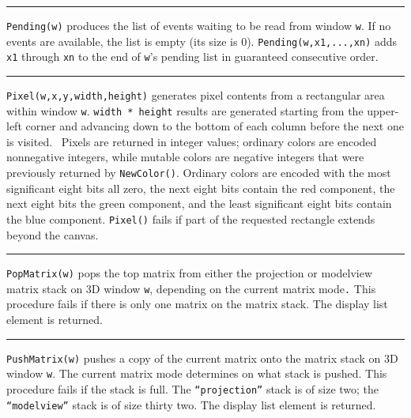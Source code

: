 \bigskip\hrule\vspace{0.1cm}

\noindent
\texttt{Pending(w)} produces the list of events waiting to be read from
window \texttt{w}. If no events are available, the list is empty (its
size is 0). \texttt{Pending(w,x1,...,xn)} adds \texttt{x1} through
\texttt{xn} to the end of \texttt{w}'s pending list in
guaranteed consecutive order.

\bigskip\hrule\vspace{0.1cm}

\noindent
\texttt{Pixel(w,x,y,width,height)} generates pixel contents from a
rectangular area within window \texttt{w}. \texttt{width * height}
results are generated starting from the upper-left corner and advancing
down to the bottom of each column before the next one is visited.
\ Pixels are returned in integer values; ordinary colors are encoded
nonnegative integers, while mutable colors are negative integers that
were previously returned by \texttt{NewColor()}. Ordinary colors are
encoded with the most significant eight bits all zero, the next eight
bits contain the red component, the next eight bits the green
component, and the least significant eight bits contain the blue
component. \texttt{Pixel()} fails if part of the requested rectangle
extends beyond the canvas.

\bigskip\hrule\vspace{0.1cm}

\noindent
\texttt{PopMatrix(w)} pops the top matrix from either the projection or
modelview matrix stack on 3D window \texttt{w}, depending on the
current matrix mode\texttt{.} This procedure fails if there is only one
matrix on the matrix stack. The display list element is returned. 

\bigskip\hrule\vspace{0.1cm}

\noindent
\texttt{PushMatrix(w)} pushes a copy of the current matrix onto the
matrix stack on 3D window \texttt{w}. The current matrix mode
determines on what stack is pushed. This procedure fails if the stack
is full. The \texttt{{\textquotedblleft}projection{\textquotedblright}}
stack is of size two; the
\texttt{{\textquotedblleft}modelview{\textquotedblright}} stack is of
size thirty two. The display list element is returned.

